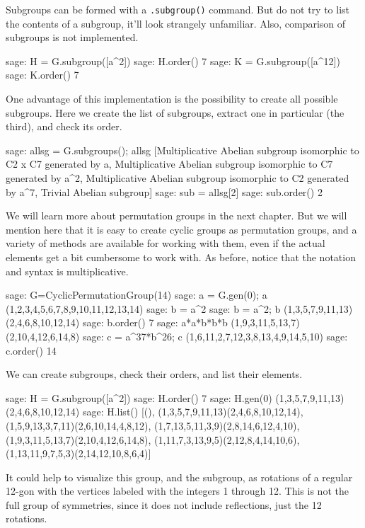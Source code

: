 %
Subgroups can be formed with a \verb?.subgroup()? command.  But do not try to list the contents of a subgroup, it'll look strangely unfamiliar.  Also, comparison of subgroups is not implemented.
%
\begin{sageexample}
sage: H = G.subgroup([a^2])
sage: H.order()
7
sage: K = G.subgroup([a^12])
sage: K.order()
7
\end{sageexample}
%
One advantage of this implementation is the possibility to create all possible subgroups.  Here we create the list of subgroups, extract one in particular (the third), and check its order.
%
\begin{sageexample}
sage: allsg = G.subgroups(); allsg
[Multiplicative Abelian subgroup isomorphic to C2 x C7 generated by {a},
 Multiplicative Abelian subgroup isomorphic to C7 generated by {a^2},
 Multiplicative Abelian subgroup isomorphic to C2 generated by {a^7},
 Trivial Abelian subgroup]
sage: sub = allsg[2]
sage: sub.order()
2
\end{sageexample}
%
%
We will learn more about permutation groups in the next chapter.  But we will mention here that it is easy to create cyclic groups as permutation groups, and a variety of methods are available for working with them, even if the actual elements get a bit cumbersome to work with.  As before, notice that the notation and syntax is multiplicative.
%
\begin{sageexample}
sage: G=CyclicPermutationGroup(14)
sage: a = G.gen(0); a
(1,2,3,4,5,6,7,8,9,10,11,12,13,14)
sage: b = a^2
sage: b = a^2; b
(1,3,5,7,9,11,13)(2,4,6,8,10,12,14)
sage: b.order()
7
sage: a*a*b*b*b
(1,9,3,11,5,13,7)(2,10,4,12,6,14,8)
sage: c = a^37*b^26; c
(1,6,11,2,7,12,3,8,13,4,9,14,5,10)
sage: c.order()
14
\end{sageexample}
%
We can create subgroups, check their orders, and list their elements.
%
\begin{sageexample}
sage: H = G.subgroup([a^2])
sage: H.order()
7
sage: H.gen(0)
(1,3,5,7,9,11,13)(2,4,6,8,10,12,14)
sage: H.list()
[(),
 (1,3,5,7,9,11,13)(2,4,6,8,10,12,14),
 (1,5,9,13,3,7,11)(2,6,10,14,4,8,12),
 (1,7,13,5,11,3,9)(2,8,14,6,12,4,10),
 (1,9,3,11,5,13,7)(2,10,4,12,6,14,8),
 (1,11,7,3,13,9,5)(2,12,8,4,14,10,6),
 (1,13,11,9,7,5,3)(2,14,12,10,8,6,4)]
\end{sageexample}
%
It could help to visualize this group, and the subgroup, as rotations of a regular 12-gon with the vertices labeled with the integers 1 through 12.  This is not the full group of symmetries, since it does not include reflections, just the 12 rotations.

